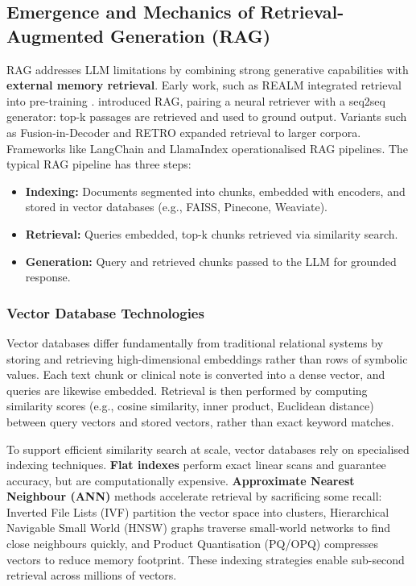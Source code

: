 \subsection{Emergence and Mechanics of Retrieval-Augmented Generation (RAG)}

RAG addresses LLM limitations by combining strong generative capabilities with \textbf{external memory retrieval}. Early work, such as REALM integrated retrieval into pre-training \citep{guu2020realm}. \citep{lewis2020rag} introduced RAG, pairing a neural retriever with a seq2seq generator: top-k passages are retrieved and used to ground output. Variants such as Fusion-in-Decoder \citep{izacard2021leveraging} and RETRO \citep{borgeaud2022retro} expanded retrieval to larger corpora. Frameworks like LangChain \citep{langchain2023} and LlamaIndex \citep{llamaindex2023} operationalised RAG pipelines.
\newline The typical RAG pipeline has three steps:
\begin{itemize}
  \item \textbf{Indexing:} Documents segmented into chunks, embedded with encoders, and stored in vector databases (e.g., FAISS, Pinecone, Weaviate).
  \item \textbf{Retrieval:} Queries embedded, top-k chunks retrieved via similarity search.
  \item \textbf{Generation:} Query and retrieved chunks passed to the LLM for grounded response.
\end{itemize}

\subsubsection{Vector Database Technologies}
Vector databases differ fundamentally from traditional relational systems by storing and retrieving high-dimensional embeddings rather than rows of symbolic values. Each text chunk or clinical note is converted into a dense vector, and queries are likewise embedded. Retrieval is then performed by computing similarity scores (e.g., cosine similarity, inner product, Euclidean distance) between query vectors and stored vectors, rather than exact keyword matches.

To support efficient similarity search at scale, vector databases rely on specialised indexing techniques. \textbf{Flat indexes} perform exact linear scans and guarantee accuracy, but are computationally expensive. \textbf{Approximate Nearest Neighbour (ANN)} methods accelerate retrieval by sacrificing some recall: Inverted File Lists (IVF) partition the vector space into clusters, Hierarchical Navigable Small World (HNSW) graphs traverse small-world networks to find close neighbours quickly, and Product Quantisation (PQ/OPQ) compresses vectors to reduce memory footprint. These indexing strategies enable sub-second retrieval across millions of vectors.

